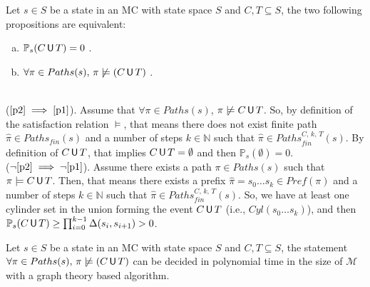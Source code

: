 \begin{lemma} Let $s \in S$ be a state in an MC with state space $S$ and $C, T \subseteq S$, the two following propositions are equivalent:
  \begin{enumerate}[(a)]
    \item $\mathbb{P}_s(C \,\text{\sffamily U}\, T) = 0$ \label{p1}.
    \item $\forall \pi \in Paths(s), \, \pi \not \models (C \,\text{\sffamily U}\, T)$ \label{p2}.
  \end{enumerate}
\end{lemma}

 \begin{proof2}$ $\\
    ($\ref{p2}\implies\ref{p1}$). Assume that $\forall \pi \in
    Paths(s)$, $\pi \centernot\models C \U T$. So, by definition of the satisfaction relation $\models$, that
    means there does not exist finite path $\hat{\pi} \in
    Paths_{fin}(s)$ and a number of steps $k \in \mathbb{N}$ such that
    $\hat{\pi} \in Paths_{fin}^{C, \, k,\, T}(s)$. By definition
    of $C \,\text{\sffamily U}\, T$, that implies $C \,\text{\sffamily U}\, T = \emptyset$ and then
    $\mathbb{P}_s(\emptyset) = 0$.\\
    ($\neg\ref{p2}\implies\neg\ref{p1}$). Assume there exists a path $\pi \in Paths(s)$ such that $\pi \models C \,\text{\sffamily U}\, T$.
    Then, that means there exists a prefix $\hat{\pi} = s_0 \dots s_k \in Pref(\pi)$ and a number of steps $k \in \mathbb{N}$ such that
    $\hat{\pi} \in Paths_{fin}^{C, \, k, \, T}(s)$. So, we have at least one cylinder set in the union forming the event $C \,\text{\sffamily U}\, T$ (i.e., $Cyl(s_0\dots s_k)$), and then $\mathbb{P}_s(C \,\text{\sffamily U}\, T) \geq \prod_{i = 0}^{k-1} \Delta(s_i , s_{i+1}) > 0$.
 \end{proof2}

\begin{lemma}[Computing $S_{=0}$ with graph theory]\label{S0graph}
Let $s \in S$ be a state in an MC with state space $S$ and $C, T \subseteq S$,
  the statement $\forall \pi \in Paths(s), \, \pi \centernot \models (C \U T)$ can be decided in polynomial time in the size of $\mathcal{M}$ with a graph theory based algorithm.
\end{lemma}

